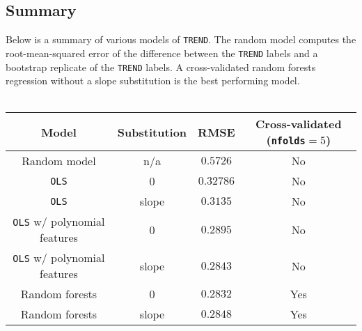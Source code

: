 \subsection{Summary}
Below is a summary of various models of \texttt{TREND}. The random model computes the root-mean-squared error of the difference between the \texttt{TREND} labels and a bootstrap replicate of the \texttt{TREND} labels. A cross-validated random forests regression without a slope substitution is the best performing model.
\\\\
\begin{table}[h!]
\centering
\begin{tabular}{||c c c c||}
 \hline
 Model & Substitution & RMSE & Cross-validated (\texttt{nfolds}$=5$)\\ [0.5ex] 
 \hline\hline
Random model & n/a & $0.5726$ & No\\
\texttt{OLS} & 0 & $0.32786$ & No\\
\texttt{OLS} & slope & $0.3135$ & No\\
\texttt{OLS} w/ polynomial features & 0 & $0.2895$ & No\\
\texttt{OLS} w/ polynomial features & slope & $0.2843$ & No\\
Random forests & 0 & $0.2832$ & Yes\\
Random forests & slope & $0.2848$ & Yes\\
 \hline
\end{tabular}
\label{table:2}
\end{table}
